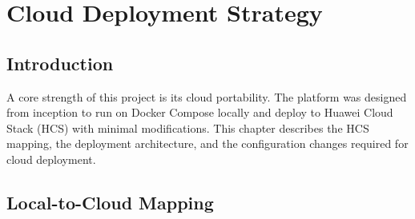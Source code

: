 \chapter{Cloud Deployment Strategy}
\label{ch:cloud}

\section{Introduction}

A core strength of this project is its cloud portability. The platform was designed from inception to run on Docker Compose locally and deploy to Huawei Cloud Stack (HCS) with minimal modifications. This chapter describes the HCS mapping, the deployment architecture, and the configuration changes required for cloud deployment.

\section{Local-to-Cloud Mapping}

